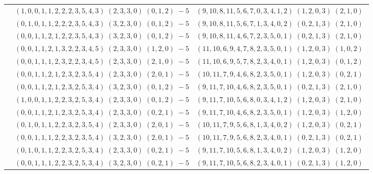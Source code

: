 \documentclass[11pt]{article}
\begin{document}
\begin{longtable}[l]{|c|c|c|}
 \cline{2-3} 
 & $(1 ,0 ,0 ,1 ,1 ,2 ,2 ,2 ,3 ,5 ,4 ,3) \;(2 ,3 ,3 ,0) \;(0 ,1 ,2) \;-5$ & $(9 ,10 ,8 ,11 ,5 ,6 ,7 ,0 ,3 ,4 ,1 ,2) \;(1 ,2 ,0 ,3) \;(2 ,1 ,0) \;$\\ 
 \cline{2-3} 
 & $(0 ,1 ,0 ,1 ,1 ,2 ,2 ,2 ,3 ,5 ,4 ,3) \;(3 ,2 ,3 ,0) \;(0 ,1 ,2) \;-5$ & $(9 ,10 ,8 ,11 ,5 ,6 ,7 ,1 ,3 ,4 ,0 ,2) \;(0 ,2 ,1 ,3) \;(2 ,1 ,0) \;$\\ 
 \cline{2-3} 
 & $(0 ,0 ,1 ,1 ,2 ,1 ,2 ,2 ,3 ,5 ,4 ,3) \;(3 ,2 ,3 ,0) \;(0 ,1 ,2) \;-5$ & $(9 ,10 ,8 ,11 ,4 ,6 ,7 ,2 ,3 ,5 ,0 ,1) \;(0 ,2 ,1 ,3) \;(2 ,1 ,0) \;$\\ 
 \cline{2-3} 
 & $(0 ,0 ,1 ,1 ,2 ,1 ,3 ,2 ,2 ,3 ,4 ,5) \;(2 ,3 ,3 ,0) \;(1 ,2 ,0) \;-5$ & $(11 ,10 ,6 ,9 ,4 ,7 ,8 ,2 ,3 ,5 ,0 ,1) \;(1 ,2 ,0 ,3) \;(1 ,0 ,2) \;$\\ 
 \cline{2-3} 
 & $(0 ,0 ,1 ,1 ,1 ,2 ,3 ,2 ,2 ,3 ,4 ,5) \;(2 ,3 ,3 ,0) \;(2 ,1 ,0) \;-5$ & $(11 ,10 ,6 ,9 ,5 ,7 ,8 ,2 ,3 ,4 ,0 ,1) \;(1 ,2 ,0 ,3) \;(0 ,1 ,2) \;$\\ 
 \cline{2-3} 
 & $(0 ,0 ,1 ,1 ,2 ,1 ,2 ,3 ,2 ,3 ,5 ,4) \;(2 ,3 ,3 ,0) \;(2 ,0 ,1) \;-5$ & $(10 ,11 ,7 ,9 ,4 ,6 ,8 ,2 ,3 ,5 ,0 ,1) \;(1 ,2 ,0 ,3) \;(0 ,2 ,1) \;$\\ 
 \cline{2-3} 
 & $(0 ,0 ,1 ,1 ,2 ,1 ,2 ,3 ,2 ,5 ,3 ,4) \;(3 ,2 ,3 ,0) \;(0 ,1 ,2) \;-5$ & $(9 ,11 ,7 ,10 ,4 ,6 ,8 ,2 ,3 ,5 ,0 ,1) \;(0 ,2 ,1 ,3) \;(2 ,1 ,0) \;$\\ 
 \cline{2-3} 
 & $(1 ,0 ,0 ,1 ,1 ,2 ,2 ,3 ,2 ,5 ,3 ,4) \;(2 ,3 ,3 ,0) \;(0 ,1 ,2) \;-5$ & $(9 ,11 ,7 ,10 ,5 ,6 ,8 ,0 ,3 ,4 ,1 ,2) \;(1 ,2 ,0 ,3) \;(2 ,1 ,0) \;$\\ 
 \cline{2-3} 
 & $(0 ,0 ,1 ,1 ,2 ,1 ,2 ,3 ,2 ,5 ,3 ,4) \;(2 ,3 ,3 ,0) \;(0 ,2 ,1) \;-5$ & $(9 ,11 ,7 ,10 ,4 ,6 ,8 ,2 ,3 ,5 ,0 ,1) \;(1 ,2 ,0 ,3) \;(1 ,2 ,0) \;$\\ 
 \cline{2-3} 
 & $(0 ,1 ,0 ,1 ,1 ,2 ,2 ,3 ,2 ,3 ,5 ,4) \;(2 ,3 ,3 ,0) \;(2 ,0 ,1) \;-5$ & $(10 ,11 ,7 ,9 ,5 ,6 ,8 ,1 ,3 ,4 ,0 ,2) \;(1 ,2 ,0 ,3) \;(0 ,2 ,1) \;$\\ 
 \cline{2-3} 
 & $(0 ,0 ,1 ,1 ,1 ,2 ,2 ,3 ,2 ,3 ,5 ,4) \;(3 ,2 ,3 ,0) \;(2 ,0 ,1) \;-5$ & $(10 ,11 ,7 ,9 ,5 ,6 ,8 ,2 ,3 ,4 ,0 ,1) \;(0 ,2 ,1 ,3) \;(0 ,2 ,1) \;$\\ 
 \cline{2-3} 
 & $(0 ,1 ,0 ,1 ,1 ,2 ,2 ,3 ,2 ,5 ,3 ,4) \;(2 ,3 ,3 ,0) \;(0 ,2 ,1) \;-5$ & $(9 ,11 ,7 ,10 ,5 ,6 ,8 ,1 ,3 ,4 ,0 ,2) \;(1 ,2 ,0 ,3) \;(1 ,2 ,0) \;$\\ 
 \cline{2-3} 
 & $(0 ,0 ,1 ,1 ,1 ,2 ,2 ,3 ,2 ,5 ,3 ,4) \;(3 ,2 ,3 ,0) \;(0 ,2 ,1) \;-5$ & $(9 ,11 ,7 ,10 ,5 ,6 ,8 ,2 ,3 ,4 ,0 ,1) \;(0 ,2 ,1 ,3) \;(1 ,2 ,0) \;$\\ 

\end{longtable}
\end{document}

